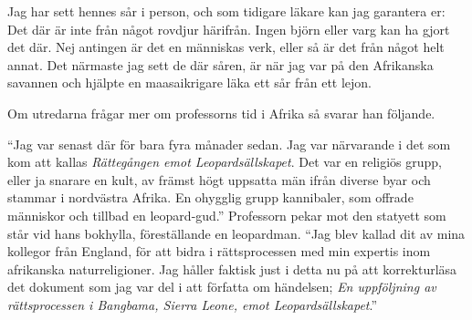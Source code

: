 \begin{displayquote}
	Jag har sett hennes sår i person, och som tidigare läkare kan jag garantera er: Det där är inte från något rovdjur härifrån. Ingen björn eller varg kan ha gjort det där. Nej antingen är det en människas verk, eller så är det från något helt annat. Det närmaste jag sett de där såren, är när jag var på den Afrikanska savannen och hjälpte en maasaikrigare läka ett sår från ett lejon.
\end{displayquote}
%
Om utredarna frågar mer om professorns tid i Afrika så svarar han följande.

\begin{displayquote}
	``Jag var senast där för bara fyra månader sedan. Jag var närvarande i det som kom att kallas \textit{Rättegången emot Leopardsällskapet}. Det var en religiös grupp, eller ja snarare en kult, av främst högt uppsatta män ifrån diverse byar och stammar i nordvästra Afrika. En ohygglig grupp kannibaler, som offrade människor och tillbad en leopard-gud.'' Professorn pekar mot den statyett som står vid hans bokhylla, föreställande en leopardman. ``Jag blev kallad dit av mina kollegor från England, för att bidra i rättsprocessen med min expertis inom afrikanska naturreligioner. Jag håller faktisk just i detta nu på att korrekturläsa det dokument som jag var del i att författa om händelsen; \textit{En uppföljning av rättsprocessen i Bangbama, Sierra Leone, emot Leopardsällskapet}.''
\end{displayquote}

